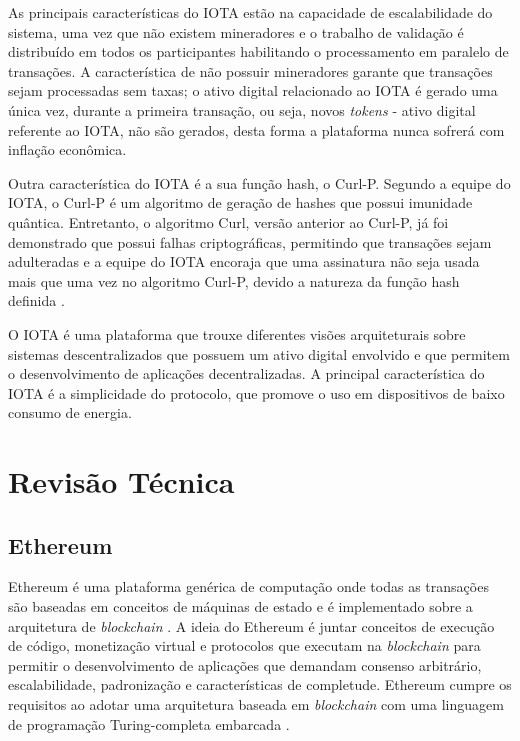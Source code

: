 \documentclass[tcc,capa]{texufpel}
\begin{document}
    As principais características do IOTA estão na capacidade de escalabilidade do sistema, uma vez que não existem mineradores e o trabalho de validação é distribuído em todos os participantes habilitando o processamento em paralelo de transações. A característica de não possuir mineradores garante que transações sejam processadas sem taxas; o ativo digital relacionado ao IOTA é gerado uma única vez, durante a primeira transação, ou seja, novos \textit{tokens} - ativo digital referente ao IOTA, não são gerados, desta forma a plataforma nunca sofrerá com inflação econômica.
    
    Outra característica do IOTA é a sua função hash, o Curl-P. Segundo a equipe do IOTA, o Curl-P é um algoritmo de geração de hashes que possui imunidade quântica. Entretanto, o algoritmo Curl, versão anterior ao Curl-P, já foi demonstrado que possui falhas criptográficas, permitindo que transações sejam adulteradas \cite{heilman} e a equipe do IOTA encoraja que uma assinatura não seja usada mais que uma vez no algoritmo Curl-P, devido a natureza da função hash definida \cite{teamiota}.
    
    O IOTA é uma plataforma que trouxe diferentes visões arquiteturais sobre sistemas descentralizados que possuem um ativo digital envolvido e que permitem o desenvolvimento de aplicações decentralizadas. A principal característica do IOTA é a simplicidade do protocolo, que promove o uso em dispositivos de baixo consumo de energia.
    
\chapter{Revisão Técnica}\label{chap:revisao-tecnica}


\section{Ethereum}\label{ssc:ethereum}

    Ethereum é uma plataforma genérica de computação onde todas as transações são baseadas em conceitos de máquinas de estado e é implementado sobre a arquitetura de \textit{blockchain} \cite{wood2014ethereum}. A ideia do Ethereum é juntar conceitos de execução de código, monetização virtual e protocolos que executam na \textit{blockchain} para permitir o desenvolvimento de aplicações que demandam consenso arbitrário, escalabilidade, padronização e características de completude. Ethereum cumpre os requisitos ao adotar uma arquitetura baseada em \textit{blockchain} com uma linguagem de programação Turing-completa embarcada \cite{buterin2014next}.
    
\end{document}
